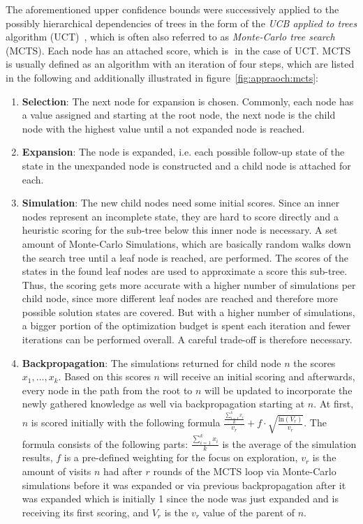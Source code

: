 The aforementioned upper confidence bounds were successively applied to the possibly hierarchical dependencies of trees in the form of the \textit{UCB applied to trees} algorithm (UCT)~\cite{Kocsis-UCT}, which is often also referred to as \textit{Monte-Carlo tree search} (MCTS).
Each node has an attached score, which is $ $ in the case of UCT.
MCTS is usually defined as an algorithm with an iteration of four steps, which are listed in the following and additionally illustrated in figure~\ref{fig:appraoch:mcts}:
\begin{enumerate}
    \item \textbf{Selection}: The next node for expansion is chosen.
    Commonly, each node has a value assigned and starting at the root node, the next node is the child node with the highest value until a not expanded node is reached.
    \item \textbf{Expansion}: The node is expanded, i.e. each possible follow-up state of the state in the unexpanded node is constructed and a child node is attached for each.
    \item \textbf{Simulation}: The new child nodes need some initial scores.
    Since an inner nodes represent an incomplete state, they are hard to score directly and a heuristic scoring for the sub-tree below this inner node is necessary.
    A set amount of Monte-Carlo Simulations, which are basically random walks down the search tree until a leaf node is reached, are performed.
    The scores of the states in the found leaf nodes are used to approximate a score this sub-tree.
    Thus, the scoring gets more accurate with a higher number of simulations per child node, since more different leaf nodes are reached and therefore more possible solution states are covered.
    But with a higher number of simulations, a bigger portion of the optimization budget is spent each iteration and fewer iterations can be performed overall.
    A careful trade-off is therefore necessary.
    \item \textbf{Backpropagation}: The simulations returned for child node $n$ the scores $x_1, ..., x_k$.
    Based on this scores $n$ will receive an initial scoring and afterwards, every node in the path from the root to $n$ will be updated to incorporate the newly gathered knowledge as well via backpropagation starting at $n$.
    At first, $n$ is scored initially with the following formula $\frac{\frac{\sum_{i=1}^k x_i}{k}}{v_r} + f \cdot \sqrt{\frac{\mathrm{ln} (V_r)}{v_r}}$.
    The formula consists of the following parts: $\frac{\sum_{i=1}^k x_i}{k}$ is the average of the simulation results, $f$ is a pre-defined weighting for the focus on exploration, $v_r$ is the amount of visits $n$ had after $r$ rounds of the MCTS loop via Monte-Carlo simulations before it was expanded or via previous backpropagation after it was expanded which is initially 1 since the node was just expanded and is receiving its first scoring, and $V_r$ is the $v_r$ value of the parent of $n$.

\end{enumerate}
